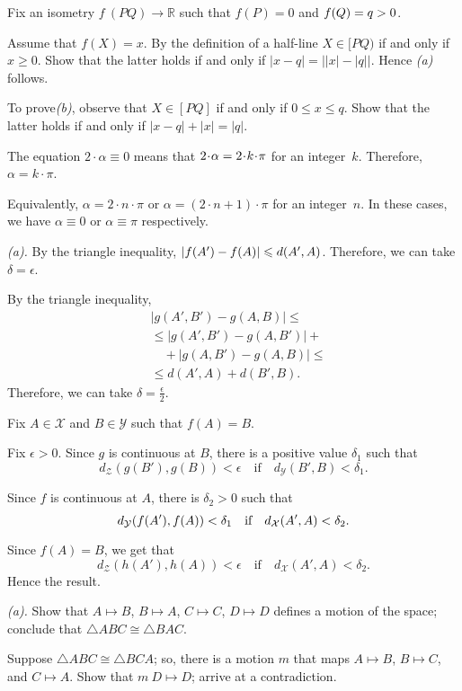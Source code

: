 \begin{multicols}{2}
Fix an isometry $f\:(P Q)\to \mathbb{R}$ such that $f(P)=0$ and $f(Q)\z=q>0$.

Assume that $f(X)=x$.
By the definition of a half-line $X\in[PQ)$ if and only if $x\ge 0$.
Show that the latter holds if and only if 
$|x-q|=\bigl||x|-|q|\bigr|$.
Hence \textit{(a)} follows.

To prove\textit{(b)}, observe that $X\in [PQ]$ if and only if $0\le x\le q$.
Show that the latter holds if and only if 
$|x-q|+|x|=|q|$.

The equation
$2\cdot\alpha\equiv 0$
means that $2\cdot\alpha\z=2\cdot k\cdot\pi$ for an integer~$k$.
Therefore,
$\alpha=k\cdot\pi$.

Equivalently, $\alpha=2\cdot n\cdot \pi$ or $\alpha=(2\cdot n+1)\cdot \pi$ for an integer~$n$.
In these cases, we have $\alpha\equiv 0$ or $\alpha\equiv \pi$ respectively.

 \textit{(a).}
By the triangle inequality,
$|f(A')\z-f(A)|\le d(A',A)$.
Therefore, we can take $\delta=\epsilon$.

By the triangle inequality,
\begin{align*}
&|g(A',B')-g(A,B)|
\le 
\\
&\le|g(A',B')-g(A,B')|+
\\
&\quad+
|g(A,B')-g(A,B)|\le
\\
&\le d(A',A)+d(B',B).
\end{align*}
Therefore, we can take $\delta=\tfrac\epsilon2$.

Fix $A\in \mathcal{X}$ and $B\in\mathcal{Y}$
such that $f(A)=B$.

Fix $\epsilon>0$.
Since $g$ is continuous at $B$, there is a positive value $\delta_1$ such that 
$$d_{\mathcal{Z}}(g(B'),g(B))<\epsilon
\quad
\text{if}
\quad
d_{\mathcal{Y}}(B',B)<\delta_1.$$ 

Since $f$ is continuous at $A$, there is $\delta_2>0$ such that 
$$d_{\mathcal{Y}}(f(A'),f(A))\z<\delta_1
\quad
\text{if}
\quad
d_{\mathcal{X}}(A',A)<\delta_2.$$ 

Since $f(A)=B$, we get that
$$d_{\mathcal{Z}}(h(A'),h(A))<\epsilon
\quad
\text{if}
\quad
d_{\mathcal{X}}(A',A)<\delta_2.$$ 
Hence the result.

 \textit{(a).}
Show that $A\mapsto B$, $B\mapsto A$, $C\mapsto C$, $D\mapsto D$ defines a motion of the space;
conclude that $\triangle ABC\cong \triangle BAC$.

 Suppose $\triangle ABC\cong \triangle BCA$; so, there is a motion $m$ that maps $A\mapsto B$, $B\mapsto C$, and $C\mapsto A$.
Show that $m\:D\mapsto D$; arrive at a contradiction.



\end{multicols}
